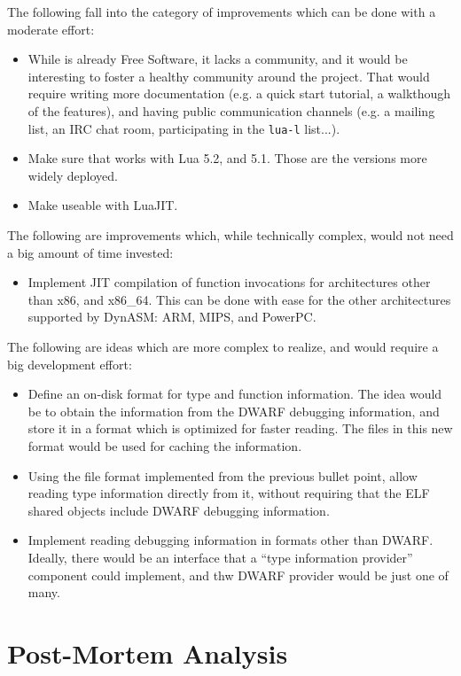 The following fall into the category of improvements which can be done with
a moderate effort:

\begin{itemize}

	\item While \Eol* is already Free Software, it lacks a community, and it
	would be interesting to foster a healthy community around the project.
	That would require writing more documentation (e.g. a quick start
	tutorial, a walkthough of the features), and having public communication
	channels (e.g. a mailing list, an \gls{IRC} chat room, participating in
	the \verb|lua-l| list...).

	\item Make sure that \Eol* works with Lua 5.2, and 5.1. Those are the
	versions more widely deployed.

	\item Make \Eol* useable with LuaJIT.

\end{itemize}

The following are improvements which, while technically complex, would not
need a big amount of time invested:

\begin{itemize}

	\item Implement JIT compilation of function invocations for architectures
	other than x86, and x86\_64. This can be done with ease for the other
	architectures supported by DynASM: ARM, MIPS, and PowerPC.

\end{itemize}

The following are ideas which are more complex to realize, and would require
a big development effort:

\begin{itemize}

	\item Define an on-disk format for type and function information. The idea
	would be to obtain the information from the DWARF debugging information,
	and store it in a format which is optimized for faster reading. The files
	in this new format would be used for caching the information.

	\item Using the file format implemented from the previous bullet point,
	allow reading type information directly from it, without requiring that
	the ELF shared objects include DWARF debugging information.

	\item Implement reading debugging information in formats other than DWARF.
	Ideally, there would be an interface that a “type information provider”
	component could implement, and thw DWARF provider would be just one of
	many.

\end{itemize}

\section{Post-Mortem Analysis}

